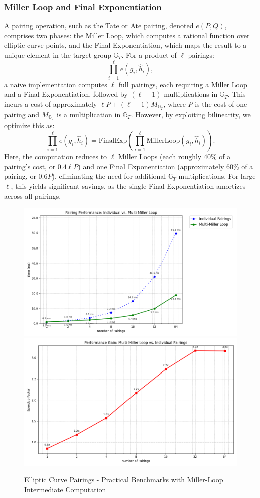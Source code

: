 \subsubsection*{Miller Loop and Final Exponentiation}
A pairing operation, such as the Tate or Ate pairing, denoted $e(P, Q)$, comprises two phases: the Miller Loop, which computes a rational function over elliptic curve points, and the Final Exponentiation, which maps the result to a unique element in the target group $\mathbb{G}_T$. For a product of $\ell$ pairings:
\[
\prod_{i=1}^\ell e(g_i, \hat{h}_i),
\]
a naive implementation computes $\ell$ full pairings, each requiring a Miller Loop and a Final Exponentiation, followed by $(\ell-1)$ multiplications in $\mathbb{G}_T$. This incurs a cost of approximately $\ell P + (\ell-1)M_{\mathbb{G}_T}$, where $P$ is the cost of one pairing and $M_{\mathbb{G}_T}$ is a multiplication in $\mathbb{G}_T$. However, by exploiting bilinearity, we optimize this as:
\[
\prod_{i=1}^\ell e(g_i, \hat{h}_i) = \text{FinalExp}\left( \prod_{i=1}^\ell \text{MillerLoop}(g_i, \hat{h}_i) \right).
\]
Here, the computation reduces to $\ell$ Miller Loops (each roughly 40\% of a pairing’s cost, or $0.4\ell P$) and one Final Exponentiation (approximately 60\% of a pairing, or $0.6P$), eliminating the need for additional $\mathbb{G}_T$ multiplications. For large $\ell$, this yields significant savings, as the single Final Exponentiation amortizes across all pairings.


\begin{figure}
    \centering
    \includegraphics[width=0.75\linewidth]{pairing_comparison.png}
        \includegraphics[width=0.75\linewidth]{pairing_comparison2.png}
    \caption{Elliptic Curve Pairings - Practical Benchmarks with Miller-Loop Intermediate Computation}
    \label{fig:elliptic_curve_pairings_speedup}
\end{figure}



